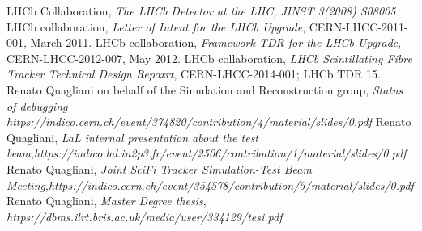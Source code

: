 \documentclass[paper=a4, fontsize=10pt]{scrartcl}
\numberwithin{equation}{section}		%
\numberwithin{figure}{section}			%
\numberwithin{table}{section}				%
\begin{document}
\begin{thebibliography}{100}
 LHCb Collaboration, \textit{The LHCb Detector at the LHC, JINST 3(2008) S08005}
 LHCb collaboration, \textit{Letter of Intent for the LHCb Upgrade}, CERN-LHCC-2011-001, March 2011.
 LHCb collaboration, \textit{Framework TDR for the LHCb Upgrade}, CERN-LHCC-2012-007, May 2012.
 LHCb collaboration, \textit{LHCb Scintillating Fibre Tracker Technical Design Repoxrt}, CERN-LHCC-2014-001; LHCb TDR 15.
 Renato Quagliani on behalf of the Simulation and Reconstruction group, \emph{Status of debugging} \textit{https://indico.cern.ch/event/374820/contribution/4/material/slides/0.pdf}
 Renato Quagliani, \textit{LaL internal presentation about the test beam},\emph{https://indico.lal.in2p3.fr/event/2506/contribution/1/material/slides/0.pdf}
 Renato Quagliani, \textit{Joint SciFi Tracker Simulation-Test Beam Meeting},\emph{https://indico.cern.ch/event/354578/contribution/5/material/slides/0.pdf}
 Renato Quagliani, \textit{Master Degree thesis}, \emph{https://dbms.ilrt.bris.ac.uk/media/user/334129/tesi.pdf}

\end{thebibliography}
\end{document}
